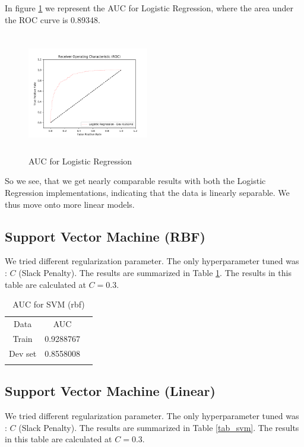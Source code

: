\documentclass[conference]{IEEEtran}
\numberwithin{equation}{section}
\numberwithin{figure}{section}
\numberwithin{table}{section}
\begin{document}
In figure \ref{lr_fig} we represent the AUC for Logistic Regression, where the area under the ROC curve is 0.89348.

\begin{figure}
\centering
  \includegraphics[width=200px, height = 200px]{lr_}
  \caption{AUC for Logistic Regression}
  \label{lr_fig}
\end{figure}

So we see, that we get nearly comparable results with both the Logistic Regression implementations, indicating that the data is linearly separable. We thus move onto more linear models.

\subsection{Support Vector Machine (RBF)}
We tried different regularization parameter. The only hyperparameter tuned was : \textit{$C$} (Slack Penalty). The results are summarized in Table \ref{tab_svm2}. The results in this table are calculated at $C = 0.3$.

\begin{table}[!htb]
 \centering
 \caption{AUC for SVM (rbf)}
 \label{tab_svm2}
\begin{tabular}{ c c c } 
	    \noalign{\smallskip}\hline\noalign{\smallskip}
		Data &   AUC \\
    	   \noalign{\smallskip}\hline\noalign{\smallskip}
		Train & 0.9288767\\
		Dev set & 0.8558008\\
				\noalign{\smallskip}\hline\noalign{\smallskip}	
  \end{tabular} 
\end{table}

\subsection{Support Vector Machine (Linear)}
We tried different regularization parameter. The only hyperparameter tuned was : \textit{$C$} (Slack Penalty). The results are summarized in Table \ref{tab_svm}.  The results in this table are calculated at $C = 0.3$.
\end{document}

